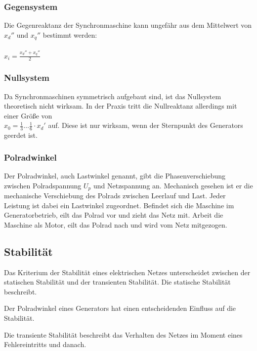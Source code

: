\documentclass{scrartcl}
\begin{document}
\begin{onehalfspace}
\subsubsection{Gegensystem}
Die Gegenreaktanz der Synchronmaschine kann ungefähr aus dem Mittelwert von $x_d''$ und $x_q''$ bestimmt werden: \\ \\
$x_i = \frac{x_d'' + x_q''}{2}$

\subsubsection{Nullsystem}
Da Synchronmaschinen symmetrisch aufgebaut sind, ist das Nullsystem theoretisch nicht wirksam. In der Praxis tritt die Nullreaktanz allerdings mit einer Größe von \\
$x_0 = \frac{1}{3} … \frac{1}{6} \cdot x_d'$ auf. Diese ist nur wirksam, wenn der Sternpunkt des Generators geerdet ist.

\subsubsection{Polradwinkel}
Der Polradwinkel, auch Lastwinkel genannt, gibt die Phasenverschiebung zwischen Polradspannung $U_p$ und Netzspannung an. Mechanisch gesehen ist er die mechanische Verschiebung des Polrads zwischen Leerlauf und Last. Jeder Leistung ist dabei ein Lastwinkel zugeordnet. Befindet sich die Maschine im Generatorbetrieb, eilt das Polrad vor und \glqq zieht\grqq{} das Netz mit. Arbeit die Maschine als Motor, eilt das Polrad nach und wird vom Netz \glqq mitgezogen\grqq.


\subsection{Stabilität}
Das Kriterium der Stabilität eines elektrischen Netzes unterscheidet zwischen der statischen Stabilität und der transienten Stabilität. Die statische Stabilität beschreibt.

Der Polradwinkel eines Generators hat einen entscheidenden Einfluss auf die Stabilität.

Die transiente Stabilität beschreibt das Verhalten des Netzes im Moment eines Fehlereintritts und danach.


\end{onehalfspace}
\end{document}
